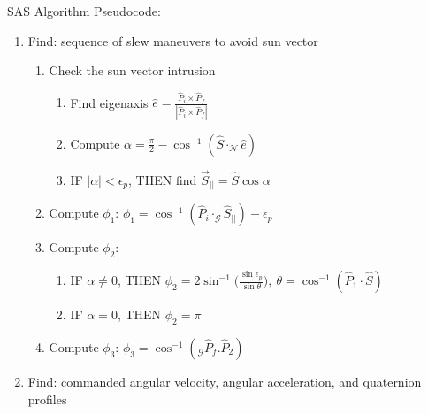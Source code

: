\documentclass{article}
\begin{document}
	

SAS Algorithm Pseudocode: 
	
	\begin{enumerate}
	
	\item Find: sequence of slew maneuvers to avoid sun vector 
	
	\begin{enumerate}
		
		\item Check the sun vector intrusion 
		
		\begin{enumerate}
			\item Find eigenaxis $
				\hat{e}=\frac{\hat{P}_i\times\hat{P}_f}{|\hat{P}_i\times \hat{P}_f|}
				$
			\item Compute $
				\alpha=\frac{\pi}{2}-\cos^{-1}(\hat{S}\cdot_\mathcal{N}\hat{e})
				$
			\item IF $|\alpha|<\epsilon_p$, THEN find 
				$
				\vec{S}_{||}=\hat{S}\cos\alpha
				$
		\end{enumerate}
		
		\item Compute $\phi_1$:
			$
			\phi_1 = \cos^{-1}(\hat{P}_i\cdot_\mathcal{G}\hat{S}_{||})-\epsilon_p
			$
			
		\item Compute $\phi_2$:
		
			\begin{enumerate}
				\item IF $\alpha \neq 0$, THEN
					$
					\phi_2 = 2\sin^{-1}\Big( \frac{ \sin\epsilon_p}{\sin \theta}\Big),\ \theta=\cos^{-1}(\hat{P}_1\cdot\hat{S})
					$
				
				\item IF $\alpha = 0$, THEN
					$
					\phi_2 = \pi
					$
				
			\end{enumerate}
			
		\item Compute $\phi_3$:
			$
			\phi_3 = \cos^{-1}(_\mathcal{G}\hat{P}_f.\hat{P}_2)
			$
		
	\end{enumerate}

	\item Find: commanded angular velocity, angular acceleration, and quaternion profiles 
	
	\begin{enumerate}
		

\end{enumerate}
\end{enumerate}
\end{document}
